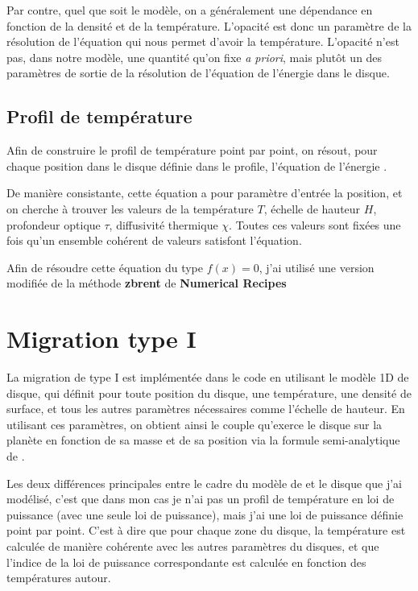 Par contre, quel que soit le modèle, on a généralement une dépendance en fonction de la densité et de la température. L'opacité est donc un paramètre de la résolution de l'équation qui nous permet d'avoir la température. L'opacité n'est pas, dans notre modèle, une quantité qu'on fixe \textit{a priori}, mais plutôt un des paramètres de sortie de la résolution de l'équation de l'énergie dans le disque.

\subsection{Profil de température}
Afin de construire le profil de température point par point, on résout, pour chaque position dans le disque définie dans le profile, l'équation de l'énergie . 

De manière consistante, cette équation a pour paramètre d'entrée la position, et on cherche à trouver les valeurs de la température $T$, échelle de hauteur $H$, profondeur optique $\tau$, diffusivité thermique $\chi$. Toutes ces valeurs sont fixées une fois qu'un ensemble cohérent de valeurs satisfont l'équation.

Afin de résoudre cette équation du type $f(x)=0$, j'ai utilisé une version modifiée de la méthode \textbf{zbrent} de \textbf{Numerical Recipes} \citep{press1992numerical}

\section{Migration type I}
La migration de type I est implémentée dans le code en utilisant le modèle 1D de disque, qui définit pour toute position du disque, une température, une densité de surface, et tous les autres paramètres nécessaires comme l'échelle de hauteur. En utilisant ces paramètres, on obtient ainsi le couple qu'exerce le disque sur la planète en fonction de sa masse et de sa position via la formule semi-analytique de \cite{paardekooper2011torque}. 

Les deux différences principales entre le cadre du modèle de \cite{paardekooper2011torque} et le disque que j'ai modélisé, c'est que dans mon cas je n'ai pas un profil de température en loi de puissance (avec une seule loi de puissance), mais j'ai une loi de puissance définie point par point. C'est à dire que pour chaque zone du disque, la température est calculée de manière cohérente avec les autres paramètres du disques, et que l'indice de la loi de puissance correspondante est calculée en fonction des températures autour.

